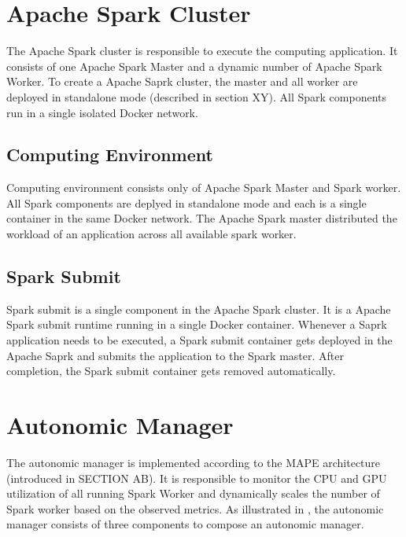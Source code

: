\section{Apache Spark Cluster}
The Apache Spark cluster is responsible to execute the computing application. It consists of one Apache Spark Master and a dynamic number of Apache Spark Worker. To create a Apache Saprk cluster, the master and all worker are deployed in standalone mode (described in section XY).
All Spark components run in a single isolated Docker network.


\subsection{Computing Environment}
Computing environment consists only of Apache Spark Master and Spark worker. All Spark components are deplyed in standalone mode and each is a single container in the same Docker network. The Apache Spark master distributed the workload of an application across all available spark worker.

\subsection{Spark Submit}
Spark submit is a single component in the Apache Spark cluster. It is a Apache Spark submit runtime running in a single Docker container. Whenever a Saprk application needs to be executed, a Spark submit container gets deployed in the Apache Saprk and submits the application to the Spark master. After completion, the Spark submit container gets removed automatically.


\section{Autonomic Manager}
The autonomic manager is implemented according to the MAPE architecture (introduced in SECTION AB). It is responsible to monitor the CPU and GPU utilization of all running Spark Worker and dynamically scales the number of Spark worker based on the observed metrics. As illustrated in , the autonomic manager consists of three components to compose an autonomic manager.


